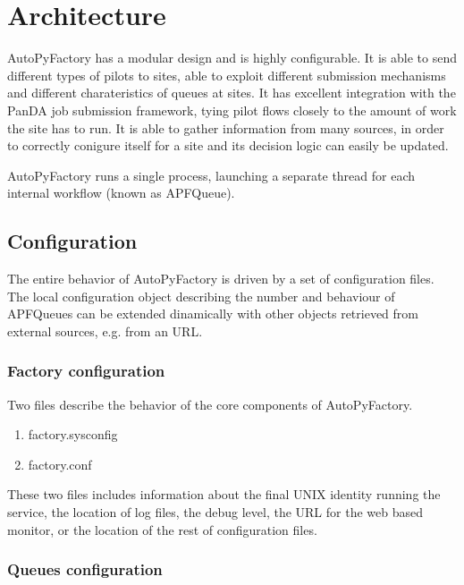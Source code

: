 \documentclass[a4paper]{jpconf}
\begin{document}
\subsection{}

\section{Architecture}


AutoPyFactory has a modular design and is highly configurable. 
It is able to send different types of pilots to sites, 
able to exploit different submission mechanisms and different charateristics of queues at sites. 
It has excellent integration with the PanDA job submission framework, 
tying pilot flows closely to the amount of work the site has to run. 
It is able to gather information from many sources, 
in order to correctly conigure itself for a site and its decision logic can easily be updated.

AutoPyFactory runs a single process,
launching a separate thread for each internal workflow (known as APFQueue).

\subsection{Configuration}

The entire behavior of AutoPyFactory is driven by a set of configuration files.
The local configuration object describing the number and behaviour of APFQueues 
can be extended dinamically with other objects retrieved from external sources, 
e.g. from an URL.

\subsubsection{Factory configuration}

Two files describe the behavior of the core components of AutoPyFactory.

\begin{enumerate}
\item factory.sysconfig
\item factory.conf
\end{enumerate}

These two files includes information about the final UNIX identity running the service,
the location of log files, the debug level, the URL for the web based monitor, 
or the location of the rest of configuration files.

\subsubsection{Queues configuration}
\end{document}
